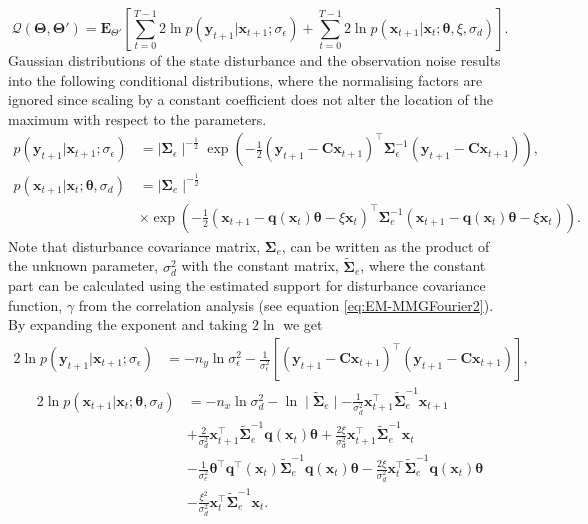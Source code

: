 \documentclass[]{article}
\begin{document}
\begin{equation}\label{eq:QIntermsofJointDist}
\mathcal Q(\boldsymbol \Theta,\boldsymbol\Theta')=\mathbf E_{\Theta'}\left[\sum_{t=0}^{T-1}2\ln p(\mathbf y_{t+1}|\mathbf x_{t+1}; \sigma_{\epsilon})+\sum_{t=0}^{T-1}2\ln p(\mathbf x_{t+1}|\mathbf x_{t};\boldsymbol \theta, \xi ,\sigma_d)\right].
\end{equation}
Gaussian distributions of the state disturbance and the observation noise results into the following conditional distributions, where the normalising factors are ignored since scaling by a constant coefficient does not alter the location of the maximum with respect to the parameters.
\begin{align}
 p\left(\mathbf y_{t+1}|\mathbf x_{t+1};\sigma_{\epsilon}\right)&= \mid\boldsymbol\Sigma_{\epsilon}\mid^{-\frac{1}{2}}  \exp\left({-\frac{1}{2}\left(\mathbf y_{t+1}-\mathbf C\mathbf  x_{t+1}\right)^\top\boldsymbol\Sigma_{\epsilon}^{-1}\left(\mathbf y_{t+1}-\mathbf C\mathbf  x_{t+1}\right)}\right),\\
p(\mathbf x_{t+1}|\mathbf x_{t};\boldsymbol \theta ,\sigma_d)&= \mid\boldsymbol\Sigma_{e}\mid^{-\frac{1}{2}} \nonumber \\
&\times\exp \left(-\frac{1}{2}(\mathbf x_{t+1}-\mathbf q(\mathbf  x_t)\boldsymbol\theta-\xi  \mathbf x_t)^\top\boldsymbol\Sigma_e^{-1}(\mathbf x_{t+1}-\mathbf q( \mathbf x_t)\boldsymbol\theta-\xi \mathbf  x_t) \right).
\end{align}
Note that disturbance covariance matrix, $\boldsymbol\Sigma_e$, can be written as the product of the unknown parameter, $\sigma_d^2$ with the constant matrix, $\tilde{\boldsymbol\Sigma}_e$, where the constant part can be  calculated using the estimated support for disturbance covariance function, $\gamma$ from the correlation analysis (see equation \eqref{eq:EM-MMGFourier2}). By expanding the exponent and taking $2\ln$ we get
\begin{align}\label{eq:CondititionDist1}
2\ln p\left(\mathbf y_{t+1}|\mathbf x_{t+1};\sigma_{\epsilon}\right)&=-n_y\ln \sigma_{\epsilon}^2-\frac{1}{\sigma_{\epsilon}^2}\left[ (\mathbf y_{t+1}-\mathbf C\mathbf  x_{t+1})^\top(\mathbf y_{t+1}-\mathbf C\mathbf  x_{t+1})\right],
\end{align}
\begin{align}
2\ln p(\mathbf x_{t+1}|\mathbf x_{t};\boldsymbol \theta ,\sigma_d)&=-n_x\ln\sigma_d^2-\ln\mid\tilde{\boldsymbol\Sigma}_e\mid-\frac{1}{\sigma_d^2}\mathbf x_{t+1}^\top\tilde{\boldsymbol\Sigma}_e^{-1}\mathbf x_{t+1}\nonumber \\
&+\frac{2}{\sigma_d^2}\mathbf x_{t+1}^\top\tilde{\boldsymbol\Sigma}_e^{-1}\mathbf q( \mathbf x_t)\boldsymbol\theta 
+\frac{2\xi}{\sigma_d^2}\mathbf x_{t+1}^\top\tilde{\boldsymbol\Sigma}_e^{-1}\mathbf x_t \nonumber \\
&-\frac{1}{\sigma_e^2}\boldsymbol\theta^\top \mathbf q^\top(\mathbf x_t)\tilde{\boldsymbol\Sigma}_e^{-1}\mathbf q(\mathbf x_t)\boldsymbol\theta-\frac{2\xi}{\sigma_d^2} \mathbf x_t^\top\tilde{\boldsymbol\Sigma}_e^{-1}\mathbf q(\mathbf x_t)\boldsymbol\theta\nonumber \\
&-\frac{\xi^2}{\sigma_d^2}\mathbf x_t^\top\tilde{\boldsymbol\Sigma}_e^{-1}\mathbf x_t. \label{eq:CondititionDist2}
\end{align}
\end{document}
